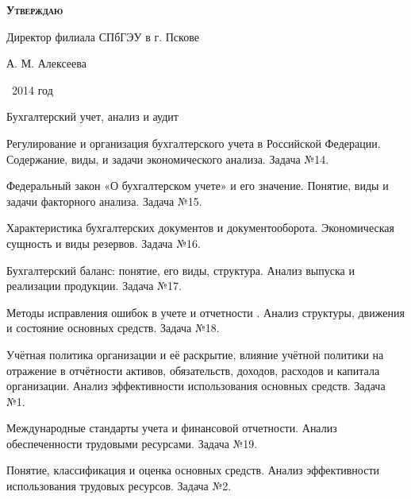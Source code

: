 \documentclass[
	11pt,
	a4paper,
	]
	{article}
\begin{document}
\newlength{\pblength}\settowidth{\pblength}{Директор филиала СПбГЭУ в г. Пскове}

\hfill\parbox{\pblength}{
	\textbf{\textsc{Утверждаю}}\medskip

	Директор филиала СПбГЭУ в г. Пскове\medskip

	\makebox[3cm]{\hrulefill} А. М. Алексеева\medskip

	\makebox[1.5cm]{<<\hrulefill>>} \makebox[3cm]{\hrulefill}\ 2014 год
}


 {Бухгалтерский учет, анализ и аудит}

	

\noindent{} 
	{
		Регулирование и организация бухгалтерского учета в Российской Федерации.
	}{
		Содержание, виды, и задачи экономического анализа.
	}{
		Задача №14.
	}

\bigskip

\noindent{} 
	{
		Федеральный закон «О бухгалтерском учете» и его значение.
	}{
		Понятие, виды и задачи факторного анализа.
	}{
		Задача №15.
	}

\bigskip

\noindent{} 
	{
		Характеристика бухгалтерских документов и документооборота.
	}{
		Экономическая сущность и виды резервов.
	}{
		Задача №16.
	}

\bigskip

\noindent{} 
	{
		Бухгалтерский баланс: понятие, его виды, структура.
	}{
		Анализ выпуска и реализации продукции.
	}{
		Задача №17.
	}

\bigskip

\noindent{} 
	{
		Методы исправления ошибок в учете и отчетности .
	}{
		Анализ структуры, движения и состояние основных средств.
	}{
		Задача №18.
	}

\bigskip

\noindent{} 
	{
		Учётная политика организации и её раскрытие, влияние учётной политики на отражение в отчётности активов, обязательств, доходов, расходов и капитала организации.
	}{
		Анализ эффективности использования основных средств.
	}{
		Задача №1.
	}

\bigskip

\noindent{} 
	{
		Международные стандарты учета и финансовой отчетности.
	}{
		Анализ обеспеченности трудовыми ресурсами.
	}{
		Задача №19.
	}

\bigskip

\noindent{} 
	{
		Понятие, классификация и оценка основных средств.
	}{
		Анализ эффективности использования трудовых ресурсов.
	}{
		Задача №2.
	}
\end{document}
